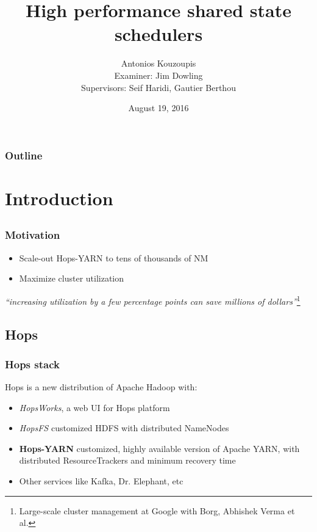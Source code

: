 \documentclass{beamer}
\title{High performance shared state schedulers}
\author[AK]{Antonios Kouzoupis\\[1em]{\footnotesize Examiner: Jim
    Dowling\\Supervisors: Seif Haridi, Gautier Berthou}}
\institute[KTH/SICS]{}
\date[date]{August 19, 2016}
\begin{document}
\section{}
\begin{frame}
\titlepage
\end{frame}

\section*{}
\begin{frame}
\frametitle{Outline}
\footnotesize
\tableofcontents
\normalsize
\end{frame}

\section{Introduction}
\subsection*{}
\begin{frame}
\frametitle{Motivation}

\begin{itemize}
\item Scale-out Hops-YARN to tens of thousands of NM
\item Maximize cluster utilization
\end{itemize}

\centering
\vfill
\emph{``increasing utilization by a few percentage points can save millions
of dollars''}\footnote{Large-scale cluster management at Google with
  Borg, Abhishek Verma et al.}
\end{frame}

\subsection{Hops}
\begin{frame}
\frametitle{Hops stack}
Hops is a new distribution of Apache Hadoop with:
\begin{itemize}
\item \emph{HopsWorks}, a web UI for Hops platform
\item \emph{HopsFS} customized HDFS with distributed NameNodes
\item \textbf{Hops-YARN} customized, highly available version of Apache
  YARN, with distributed ResourceTrackers and minimum recovery time
\item Other services like Kafka, Dr. Elephant, etc
\end{itemize}
\end{frame}
\end{document}
